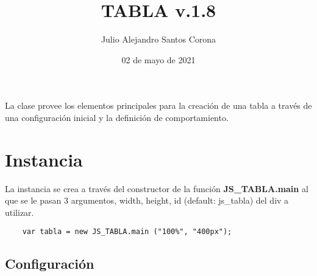 \documentclass[10pt]{article}
\title{TABLA v.1.8}
\author{Julio Alejandro Santos Corona}
\date{02 de mayo de 2021}
\begin{document}

\lstset{breaklines=true, tabsize=4, language=JavaScript}

\maketitle

La clase provee los elementos principales para la creación de una tabla a través de una configuración inicial y la definición de comportamiento.

\section{Instancia}

La instancia se crea a través del constructor de la función \textbf{JS\_TABLA.main} al que se le pasan 3 argumentos, width, height, id (default: js\_tabla) del div a utilizar.
\\
\begin{lstlisting}
	var tabla = new JS_TABLA.main ("100%", "400px");
\end{lstlisting}

\subsection{Configuración}
\end{document}

